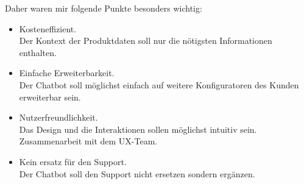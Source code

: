 Daher waren mir folgende Punkte besonders wichtig:
\begin{itemize}
    \item Kosteneffizient.\\Der Kontext der Produktdaten soll nur die nötigsten Informationen enthalten.
    \item Einfache Erweiterbarkeit.\\Der Chatbot soll möglichst einfach auf weitere Konfiguratoren des Kunden erweiterbar sein.
    \item Nutzerfreundlichkeit.\\Das Design und die Interaktionen sollen möglichst intuitiv sein. Zusammenarbeit mit dem UX-Team.
    \item Kein ersatz für den Support.\\Der Chatbot soll den Support nicht ersetzen sondern ergänzen.
\end{itemize}